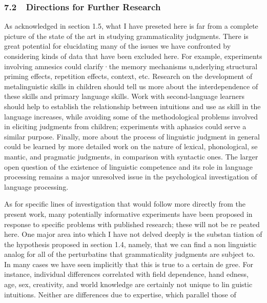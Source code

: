 \subsubsection[7.2\ \ Directions for Further Research]{7.2\ \ Directions for Further Research}
\begin{styleStandard}
As acknowledged in section 1.5, what I have preseted here is far from a complete picture of the state of the art in studying grammaticality judgments. There is great potential for elucidating many of the issues we have confronted by considering kinds of data that have been excluded here. For example, experiments involving amnesics could clarify·the memory mechanisms u,nderlying structural priming effects, repetition effects, context, etc. Research on the development of metalinguistic skills in children should tell us more about the interdependence of these skills and primary language skills. Work with second-language learners should help to establish the relationship between intuitions and use as skill in the language increases, while avoiding some of the methodological problems involved in eliciting judgments from children; experiments with aphasics could serve a similar purpose. Finally, more about the process of linguistic judgment in general could be learned by more detailed work on the nature of lexical, phonological, se\- mantic, and pragmatic judgments, in comparison with syntactic ones. The larger open question of the existence of linguistic competence and its role in language processing remains a major unresolved issue in the psychological investigation of language processing.
\end{styleStandard}


\begin{styleStandard}
As for specific lines of investigation that would follow more directly from the present work, many potentially informative experiments have been proposed in response to specific problems with published research; these will not be re\- peated here. One major area into which I have not delved deeply is the substan\- tiation of the hypothesis proposed in section 1.4, namely, that we can find a non\- linguistic analog for all of the perturbatins that grammaticality judgments are subject to. In many cases we have seen implicitly that this is true to a certain de\- gree. For instance, individual differences correlated with field dependence, hand\- edness, age, sex, creativity, and world knowledge are certainly not unique to lin\- guistic intuitions. Neither are differences due to expertise, which parallel those of
\end{styleStandard}


